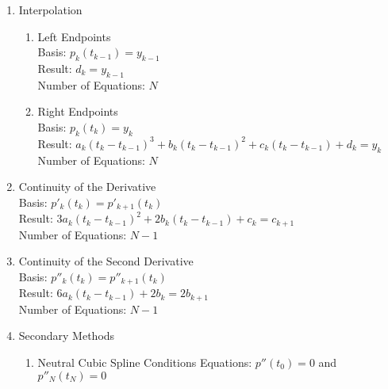 \documentclass{article}
\begin{document}
\begin{enumerate}
    \item Interpolation
    \begin{enumerate}
        \item Left Endpoints\\
        Basis: $p_k(t_{k-1}) = y_{k-1}$\\
        Result: $d_k = y_{k - 1}$\\
        Number of Equations: $N$
        \item Right Endpoints\\
        Basis: $p_k(t_k) = y_{k}$\\
        Result: $a_k(t_k - t_{k-1})^3 + b_k(t_k - t_{k-1})^2 + c_k(t_k - t_{k - 1}) + d_k = y_k$\\
        Number of Equations: $N$
    \end{enumerate}
    \item Continuity of the Derivative\\
    Basis: $p'_k(t_k) = p'_{k+1}(t_k)$\\
    Result: $3a_k(t_k - t_{k-1})^2 + 2b_k(t_k - t_{k - 1}) + c_k = c_{k + 1}$\\
    Number of Equations: $N-1$
    \item Continuity of the Second Derivative\\
    Basis: $p''_k(t_k) = p''_{k+1}(t_k)$\\
    Result: $6a_k(t_k - t_{k - 1}) + 2b_k = 2b_{k + 1}$\\
    Number of Equations: $N-1$
    \item Secondary Methods
    \begin{enumerate}
        \item Neutral Cubic Spline Conditions
        Equations: $p''(t_0) = 0$ and $p''_N(t_N) = 0$
    \end{enumerate}
\end{enumerate}
\end{document}
